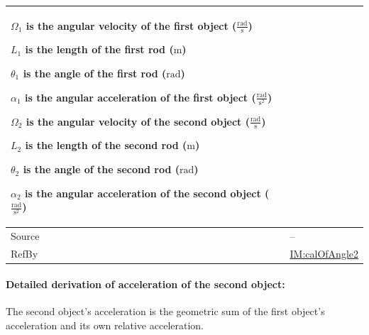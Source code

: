 \documentclass[12pt]{article}
\begin{document}
{\begin{minipage}{\textwidth}
\begin{tabular}{>{\raggedright}p{}>{\raggedright\arraybackslash}p{}}
\begin{symbDescription}
              \item{${Ω_{1}}$ is the angular velocity of the first object ($\frac{\text{rad}}{\text{s}}$)}
              \item{${L_{1}}$ is the length of the first rod (${\text{m}}$)}
              \item{${θ_{1}}$ is the angle of the first rod (${\text{rad}}$)}
              \item{${α_{1}}$ is the angular acceleration of the first object ($\frac{\text{rad}}{\text{s}^{2}}$)}
              \item{${Ω_{2}}$ is the angular velocity of the second object ($\frac{\text{rad}}{\text{s}}$)}
              \item{${L_{2}}$ is the length of the second rod (${\text{m}}$)}
              \item{${θ_{2}}$ is the angle of the second rod (${\text{rad}}$)}
              \item{${α_{2}}$ is the angular acceleration of the second object ($\frac{\text{rad}}{\text{s}^{2}}$)}
              \end{symbDescription}
\\ \midrule
Source & --
         
\\ \midrule
RefBy & \hyperref[IM:calOfAngle2]{IM:calOfAngle2}
        
\\ \bottomrule
\end{tabular}
\end{minipage}

\paragraph{Detailed derivation of acceleration of the second object:}
\label{GD:multivectorAcceleration2Deriv}
The second object's acceleration is the geometric sum of the first object's acceleration and its own relative acceleration.

}
\end{document}
